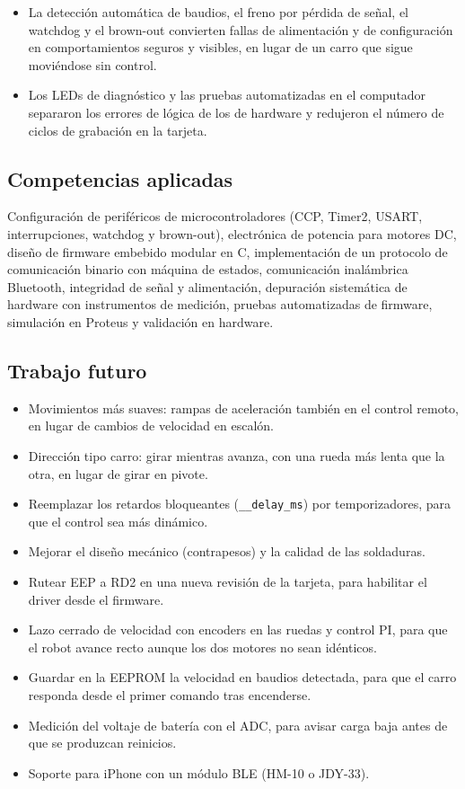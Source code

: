 \begin{itemize}
        proporcional, sin cambiar el hardware y manteniendo la compatibilidad
        con comandos de texto.
  \item La detección automática de baudios, el freno por pérdida de señal, el
        watchdog y el brown-out convierten fallas de alimentación y de
        configuración en comportamientos seguros y visibles, en lugar de un
        carro que sigue moviéndose sin control.
  \item Los LEDs de diagnóstico y las pruebas automatizadas en el computador
        separaron los errores de lógica de los de hardware y redujeron el
        número de ciclos de grabación en la tarjeta.
\end{itemize}

\subsection{Competencias aplicadas}

Configuración de periféricos de microcontroladores (CCP, Timer2, USART,
interrupciones, watchdog y brown-out), electrónica de potencia para motores DC,
diseño de firmware embebido modular en C, implementación de un protocolo de
comunicación binario con máquina de estados, comunicación inalámbrica
Bluetooth, integridad de señal y alimentación, depuración sistemática de
hardware con instrumentos de medición, pruebas automatizadas de firmware,
simulación en Proteus y validación en hardware.

\subsection{Trabajo futuro}

\begin{itemize}
  \item Movimientos más suaves: rampas de aceleración también en el control
        remoto, en lugar de cambios de velocidad en escalón.
  \item Dirección tipo carro: girar mientras avanza, con una rueda más lenta
        que la otra, en lugar de girar en pivote.
  \item Reemplazar los retardos bloqueantes (\texttt{\_\_delay\_ms}) por
        temporizadores, para que el control sea más dinámico.
  \item Mejorar el diseño mecánico (contrapesos) y la calidad de las
        soldaduras.
  \item Rutear EEP a RD2 en una nueva revisión de la tarjeta, para habilitar
        el driver desde el firmware.
  \item Lazo cerrado de velocidad con encoders en las ruedas y control PI,
        para que el robot avance recto aunque los dos motores no sean
        idénticos.
  \item Guardar en la EEPROM la velocidad en baudios detectada, para que el
        carro responda desde el primer comando tras encenderse.
  \item Medición del voltaje de batería con el ADC, para avisar carga baja
        antes de que se produzcan reinicios.
  \item Soporte para iPhone con un módulo BLE (HM-10 o JDY-33).
\end{itemize}
